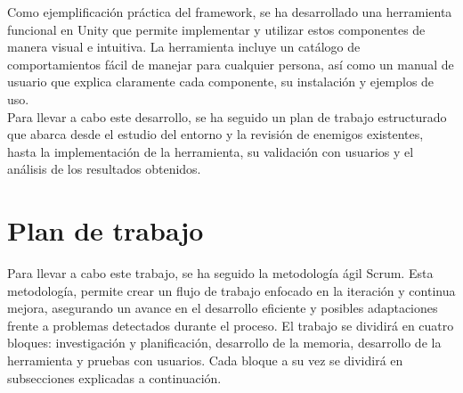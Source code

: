 Como ejemplificación práctica del framework, se ha desarrollado una herramienta funcional en Unity que permite implementar y utilizar estos componentes de manera visual e intuitiva. La herramienta incluye un catálogo de comportamientos fácil de manejar para cualquier persona, así como un manual de usuario que explica claramente cada componente, su instalación y ejemplos de uso.\\

Para llevar a cabo este desarrollo, se ha seguido un plan de trabajo estructurado que abarca desde el estudio del entorno y la revisión de enemigos existentes, hasta la implementación de la herramienta, su validación con usuarios y el análisis de los resultados obtenidos.\\

\section{Plan de trabajo}
Para llevar a cabo este trabajo, se ha seguido la metodología ágil Scrum. Esta metodología, permite crear un flujo de trabajo enfocado en la iteración y continua mejora, asegurando un avance en el desarrollo eficiente y posibles adaptaciones frente a problemas detectados durante el proceso. 
El trabajo se dividirá en cuatro bloques: investigación y planificación, desarrollo de la memoria, desarrollo de la herramienta y pruebas con usuarios.
Cada bloque a su vez se dividirá en subsecciones explicadas a continuación.
